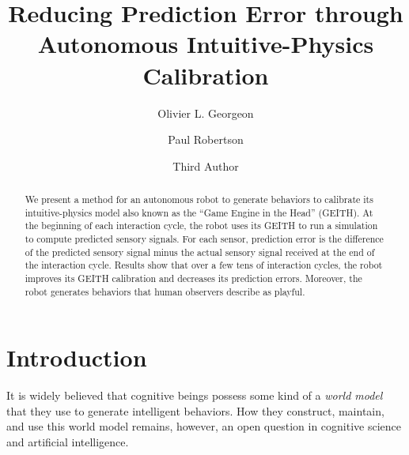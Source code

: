 \documentclass[runningheads]{llncs}
\begin{document}
%
\title{Reducing Prediction Error through Autonomous Intuitive-Physics Calibration}
%
%
\author{Olivier L. Georgeon \and
Paul Robertson \and
Third Author}
%
%
%
\maketitle              %
%
\begin{abstract}
We present a method for an autonomous robot to generate behaviors to calibrate its intuitive-physics model also known as the ``Game Engine in the Head'' (GEITH).
At the beginning of each interaction cycle, the robot uses its GEITH to run a simulation to compute predicted sensory signals. 
For each sensor, prediction error is the difference of the predicted sensory signal minus the actual sensory signal received at the end of the interaction cycle. 
Results show that over a few tens of interaction cycles, the robot improves its GEITH calibration and decreases its prediction errors. 
Moreover, the robot generates behaviors that human observers describe as playful.

\end{abstract}
%
%
%
\section{Introduction}

It is widely believed that cognitive beings possess some kind of a \textit{world model} that they use to generate intelligent behaviors.
How they construct, maintain, and use this world model remains, however,  an open question in cognitive science and artificial intelligence. 
\end{document}
